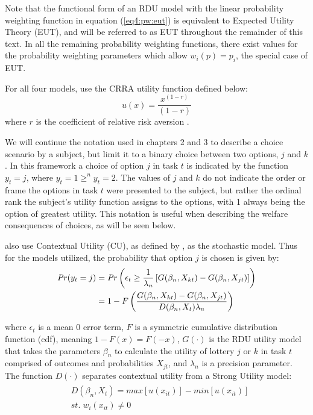 \documentclass[../main.tex]{subfiles}
\begin{document}
Note that the functional form of an RDU model with the linear probability weighting function in equation (\ref{eq4:pw:eut}) is equivalent to Expected Utility Theory (EUT), and will be referred to as EUT throughout the remainder of this text.
In all the remaining probability weighting functions, there exist values for the probability weighting parameters which allow $w_i(p) = p_i$, the special case of EUT.

For all four models, \textcite{Harrison2016} use the CRRA utility function defined below:
\begin{equation}
	\label{eq4:CRRA}
	u(x) = \frac{x^{(1-r)}}{(1-r)}
\end{equation}
\noindent where $r$ is the coefficient of relative risk aversion \parencite{Pratt1964}.

We will continue the notation used in chapters 2 and 3 to describe a choice scenario by a subject, but limit it to a binary choice between two options, $j$ and $k$.
In this framework a choice of option $j$ in task $t$ is indicated by the function $y_t = j$, where $y_t = 1 \geq^n y_t = 2$.
The values of $j$ and $k$ do not indicate the order or frame the options in task $t$ were presented to the subject, but rather the ordinal rank the subject's utility function assigns to the options, with 1 always being the option of greatest utility.
This notation is useful when describing the welfare consequences of choices, as will be seen below.

\textcite{Harrison2016} also use Contextual Utility (CU), as defined by \textcite{Wilcox2008}, as the stochastic model.
Thus for the models utilized, the probability that option $j$ is chosen is given by:
\begin{align}
	\label{eq4:RE.2}
	\begin{split}
		{\ensuremath{\mathit{Pr}}}(y_t = j) &= {\mathit{Pr}}\left(  \epsilon_t \geq \frac{1}{\lambda_n} \left[ G(\beta_n,X_{kt}) - G(\beta_n,X_{jt}) \right] \right)\\
		&= 1 - F\left( \dfrac{G(\beta_n,X_{kt}) - G(\beta_n,X_{jt})}{D(\beta_n,X_t)\lambda_n }  \right)
	\end{split}
\end{align}

\noindent where $\epsilon_t$ is a mean 0 error term, $F$ is a symmetric cumulative distribution function (cdf), meaning $1 - F(x)  = F(-x)$, $G(\cdot)$ is the RDU utility model that takes the parameters $\beta_n$ to calculate the utility of lottery $j$ or $k$ in task $t$ comprised of outcomes and probabilities $X_{jt}$, and $\lambda_n$ is a precision parameter.
The function $D(\cdot)$ separates contextual utility from a Strong Utility model:
\begin{align}
	\label{eq4:W.cu}
	\begin{split}
		&D(\beta_n,X_t) = \mathit{max}[u(x_{it})] - \mathit{min}[u(x_{it})]\\
		&\mathit{st.}\; w_i(x_{it}) \neq 0
	\end{split}
\end{align}
\end{document}
